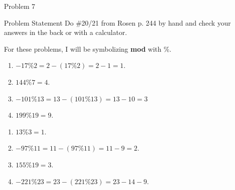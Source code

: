 \begin{problem}{Problem 7}
    \begin{statement}{Problem Statement}
        Do \#20/21 from Rosen p. 244 by hand and check your answers in the back or with a calculator.
    \end{statement}

    For these problems, I will be symbolizing \textbf{mod} with \%.

    \begin{Highlight}[Solution \#20]
        \begin{enumerate}[label = (\alph*)]
            \item $-17 \% 2 = 2 - (17 \% 2) = 2 - 1 = 1.$
            \item $144 \% 7 = 4.$
            \item $-101 \% 13 = 13 - (101 \% 13) = 13 - 10 = 3$
            \item $199 \% 19 = 9.$
        \end{enumerate}
    \end{Highlight}

    \begin{Highlight}[Solution \#21]
        \begin{enumerate}[label = (\alph*)]
            \item $13 \% 3 = 1.$
            \item $-97 \% 11 = 11 - (97 \% 11) = 11 - 9 = 2.$
            \item $155 \% 19 = 3.$
            \item $-221 \% 23 = 23 - (221 \% 23) = 23 - 14 - 9.$
        \end{enumerate}
    \end{Highlight}
\end{problem}


